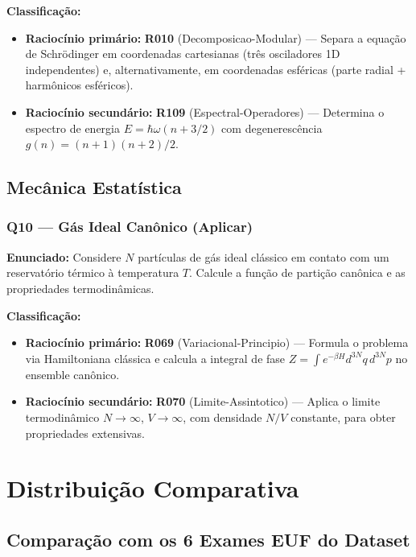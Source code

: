 \documentclass[12pt,a4paper]{article}
\newcommand{\rcode}[1]{\textcolor{azulprof}{\textbf{#1}}}
\newcommand{\bloom}[1]{\textcolor{verdeexame}{\textbf{#1}}}
\begin{document}
\medskip
\noindent\textbf{Classificação:}
\begin{itemize}
  \item \textbf{Raciocínio primário:} \rcode{R010} (Decomposicao-Modular) ---
    Separa a equação de Schrödinger em coordenadas cartesianas (três
    osciladores 1D independentes) e, alternativamente, em coordenadas
    esféricas (parte radial + harmônicos esféricos).
  \item \textbf{Raciocínio secundário:} \rcode{R109} (Espectral-Operadores) ---
    Determina o espectro de energia $E = \hbar\omega(n+3/2)$ com
    degenerescência $g(n) = (n+1)(n+2)/2$.
\end{itemize}

\subsection{Mecânica Estatística}

\subsubsection{Q10 --- Gás Ideal Canônico (\bloom{Aplicar})}

\textbf{Enunciado:} Considere $N$ partículas de gás ideal clássico em
contato com um reservatório térmico à temperatura $T$. Calcule a função
de partição canônica e as propriedades termodinâmicas.

\medskip
\noindent\textbf{Classificação:}
\begin{itemize}
  \item \textbf{Raciocínio primário:} \rcode{R069} (Variacional-Principio) ---
    Formula o problema via Hamiltoniana clássica e calcula a integral de
    fase $Z = \int e^{-\beta H} d^{3N}q\,d^{3N}p$ no ensemble canônico.
  \item \textbf{Raciocínio secundário:} \rcode{R070} (Limite-Assintotico) ---
    Aplica o limite termodinâmico $N\to\infty$, $V\to\infty$, com
    densidade $N/V$ constante, para obter propriedades extensivas.
\end{itemize}

\section{Distribuição Comparativa}

\subsection{Comparação com os 6 Exames EUF do Dataset}
\end{document}
